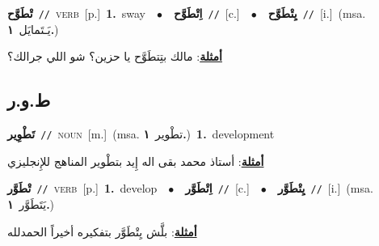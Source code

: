 \documentclass[10pt,a4paper,twoside]{article} %
\begin{document}
\begin{multicols}{2}
{\setlength\topsep{0pt}\textbf{\foreignlanguage{arabic}{تْطَوَّح}}\ {\color{gray}\texttt{//}\color{black}}\ \textsc{verb}\ [p.]\ \textbf{1.}~sway\ \ $\bullet$\ \ \setlength\topsep{0pt}\textbf{\foreignlanguage{arabic}{اِتْطَوَّح}}\ {\color{gray}\texttt{//}\color{black}}\ [c.]\ \ $\bullet$\ \ \setlength\topsep{0pt}\textbf{\foreignlanguage{arabic}{يِتْطَوَّح}}\ {\color{gray}\texttt{//}\color{black}}\ [i.]\ \color{gray}(msa. \foreignlanguage{arabic}{يَـتَمايَل}~\foreignlanguage{arabic}{\textbf{١.}})\color{black}\  \begin{flushright}\color{gray}\foreignlanguage{arabic}{\textbf{\underline{\foreignlanguage{arabic}{أمثلة}}}: مالك بتِتطَوَّح يا حزين؟ شو اللي جرالك؟}\end{flushright}\color{black}} \vspace{2mm}

\vspace{-3mm}
\subsection*{\color{blue}\foreignlanguage{arabic}{ط.و.ر}\color{blue}{}} 

{\setlength\topsep{0pt}\textbf{\foreignlanguage{arabic}{تَطْوِير}}\ {\color{gray}\texttt{//}\color{black}}\ \textsc{noun}\ [m.]\ \color{gray}(msa. \foreignlanguage{arabic}{تطْوير}~\foreignlanguage{arabic}{\textbf{١.}})\color{black}\ \textbf{1.}~development\  \begin{flushright}\color{gray}\foreignlanguage{arabic}{\textbf{\underline{\foreignlanguage{arabic}{أمثلة}}}: أستاذ محمد بقى اله إِيد بتطْوير المناهج للإِنجليزي}\end{flushright}\color{black}} \vspace{2mm}

{\setlength\topsep{0pt}\textbf{\foreignlanguage{arabic}{تْطَوَّر}}\ {\color{gray}\texttt{//}\color{black}}\ \textsc{verb}\ [p.]\ \textbf{1.}~develop\ \ $\bullet$\ \ \setlength\topsep{0pt}\textbf{\foreignlanguage{arabic}{اِتْطَوَّر}}\ {\color{gray}\texttt{//}\color{black}}\ [c.]\ \ $\bullet$\ \ \setlength\topsep{0pt}\textbf{\foreignlanguage{arabic}{يِتْطَوَّر}}\ {\color{gray}\texttt{//}\color{black}}\ [i.]\ \color{gray}(msa. \foreignlanguage{arabic}{يَتَطَوَّر}~\foreignlanguage{arabic}{\textbf{١.}})\color{black}\  \begin{flushright}\color{gray}\foreignlanguage{arabic}{\textbf{\underline{\foreignlanguage{arabic}{أمثلة}}}: بلَّش يِتْطَوَّر بتفكيره أخيراً الحمدلله}\end{flushright}\color{black}} \vspace{2mm}


\end{multicols}
\end{document}
